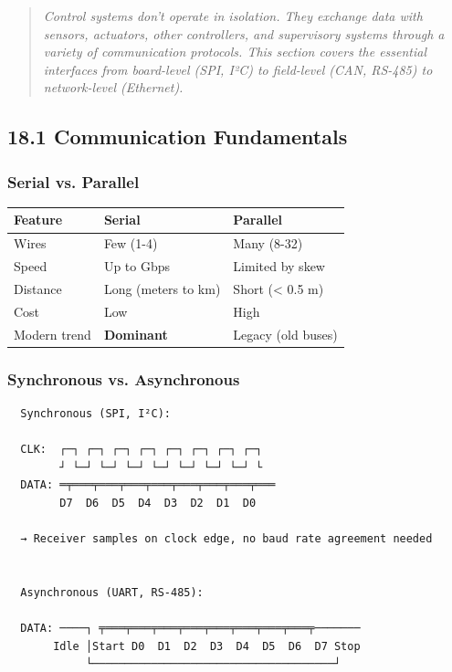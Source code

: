 \documentclass[11pt,a4paper]{book}
\begin{document}
\begin{itemize}
\begin{quote}
\textit{Control systems don't operate in isolation. They exchange data with sensors, actuators, other controllers, and supervisory systems through a variety of communication protocols. This section covers the essential interfaces from board-level (SPI, I²C) to field-level (CAN, RS-485) to network-level (Ethernet).}
\end{quote}

\medskip\noindent\hrulefill\medskip

\subsection{18.1 Communication Fundamentals}

\subsubsection{Serial vs. Parallel}

\begin{center}
\begin{tabular}{|l|l|l|}
\hline
Feature & Serial & Parallel \\
\hline
Wires & Few (1-4) & Many (8-32) \\
Speed & Up to Gbps & Limited by skew \\
Distance & Long (meters to km) & Short (< 0.5 m) \\
Cost & Low & High \\
Modern trend & \textbf{Dominant} & Legacy (old buses) \\
\hline
\end{tabular}
\end{center}

\subsubsection{Synchronous vs. Asynchronous}

\begin{lstlisting}
  Synchronous (SPI, I²C):
  
  CLK:  ┌─┐ ┌─┐ ┌─┐ ┌─┐ ┌─┐ ┌─┐ ┌─┐ ┌─┐
        ┘ └─┘ └─┘ └─┘ └─┘ └─┘ └─┘ └─┘ └
  DATA: ═╤═══╤═══╤═══╤═══╤═══╤═══╤═══╤═══
        D7  D6  D5  D4  D3  D2  D1  D0
  
  → Receiver samples on clock edge, no baud rate agreement needed
  
  
  Asynchronous (UART, RS-485):
  
  DATA: ────┐ ╤═══╤═══╤═══╤═══╤═══╤═══╤═══╤═══╤───────
       Idle │Start D0  D1  D2  D3  D4  D5  D6  D7 Stop
            └─────────────────────────────────────┘
  

\end{lstlisting}
\end{itemize}
\end{document}
